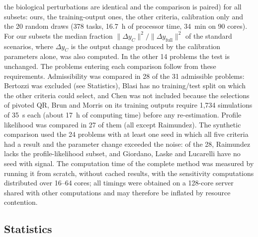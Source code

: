 \documentclass[pdflatex,sn-nature]{sn-jnl}
\theoremstyle{plain}
\begin{document}
the biological perturbations are identical and the comparison is paired) for all subsets: ours, the training-output ones, the other criteria, calibration only and the 20 random draws (378 tasks, 16.7~h of processor time, 34~min on 90 cores). For our subsets the median fraction $\|\Delta y_C\|^2/\|\Delta y_{\mathrm{full}}\|^2$ of the standard scenarios, where $\Delta y_C$ is the output change produced by the calibration parameters alone, was also computed. In the other 14 problems the test is unchanged. The problems entering each comparison follow from these requirements. Admissibility was compared in 28 of the 31 admissible problems: Bertozzi was excluded (see Statistics), Blasi has no training/test split on which the other criteria could select, and Chen was not included because the selections of pivoted QR, Brun and Morris on its training outputs require 1,734 simulations of 35~s each (about 17~h of computing time) before any re-estimation. Profile likelihood was compared in 27 of them (all except Raimundez). The synthetic comparison used the 24 problems with at least one seed in which all five criteria had a result and the parameter change exceeded the noise: of the 28, Raimundez lacks the profile-likelihood subset, and Giordano, Laske and Lucarelli have no seed with signal. The computation time of the complete method was measured by running it from scratch, without cached results, with the sensitivity computations distributed over 16--64 cores; all timings were obtained on a 128-core server shared with other computations and may therefore be inflated by resource contention.

\subsection*{Statistics}\label{met:stats}
\end{document}
